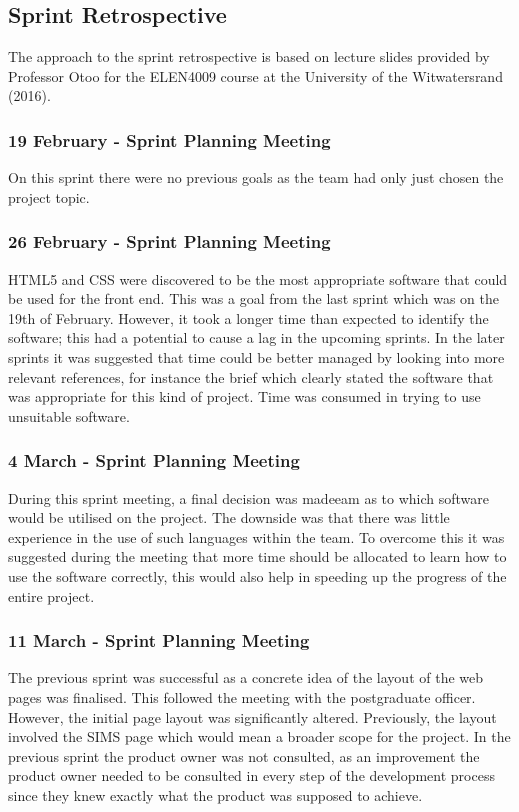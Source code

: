 \documentclass[journal]{IEEEtran}
\begin{document}
\subsection{Sprint Retrospective}
The approach to the sprint retrospective is based on lecture slides provided by Professor Otoo for the ELEN4009 course at the University of the Witwatersrand (2016).
\hfill \break \subsubsection{19 February - Sprint Planning Meeting}
On this sprint there were no previous goals as the team had only just chosen the project topic. 
\hfill \break \subsubsection{26 February - Sprint Planning Meeting}
HTML5 and CSS were discovered to be the most appropriate software that could be used for the front end.  This was a goal from the last sprint which was on the 19th of February. However, it took a longer time than expected to identify the software; this had a potential to cause a lag in the upcoming sprints.  In the later sprints it was suggested that time could be better managed by looking into more relevant references, for instance the brief which clearly stated the software that was appropriate for this kind of project. Time was consumed in trying to use unsuitable software.
\hfill \break \subsubsection{4 March - Sprint Planning Meeting}
During this sprint meeting, a final decision was madeeam as to which software would be utilised on the project. The downside was that there was little experience in the use of such languages within the team. To overcome this it was suggested during the meeting that more time should be allocated to learn how to use the software correctly, this would also help in speeding up the progress of the entire project. 
\hfill \break \subsubsection{11 March - Sprint Planning Meeting}
The previous sprint was successful as a concrete idea of the layout of the web pages was finalised. This followed the meeting with the postgraduate officer. However, the initial page layout was significantly altered. Previously, the layout involved the SIMS page which would mean a broader scope for the project. In the previous sprint the product owner was not consulted, as an improvement the product owner needed to be consulted in every step of the development process since they knew exactly what the product was supposed to achieve. 
\end{document}
